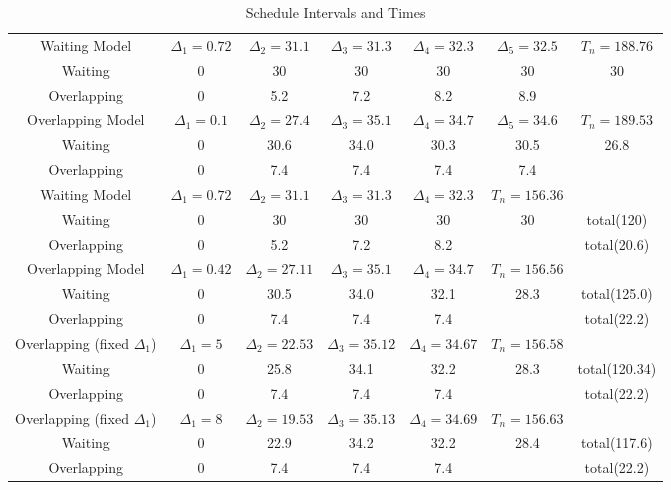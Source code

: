 \documentclass{article}
\begin{document}
\begin{table}[ht]
    \centering
    \caption{Schedule Intervals and Times}
    \begin{tabular}{ccccccc}
    \hline
    \hline
    Waiting Model  & $\Delta_1= 0.72$ & $\Delta_2= 31.1$ & $\Delta_3=31.3$ & $\Delta_4 = 32.3$ & $\Delta_5=32.5$ & $T_{n} = 188.76$ \\
    Waiting  &  0 & 30  & 30  & 30 & 30 & 30 \\
    Overlapping & 0 &  5.2 & 7.2 & 8.2 &  8.9 & \\ 
    \hline
    Overlapping Model  & $\Delta_1= 0.1$ & $\Delta_2= 27.4$ & $\Delta_3 = 35.1$ & $\Delta_4= 34.7$ & $\Delta_5 = 34.6$ & $T_{n} = 189.53$ \\
    Waiting   & 0  & 30.6 & 34.0 & 30.3 & 30.5 & 26.8 \\
    Overlapping & 0 & 7.4 & 7.4 & 7.4 & 7.4 & \\
    \hline
    Waiting Model  & $\Delta_1= 0.72$ & $\Delta_2= 31.1$ & $\Delta_3=31.3$ & $\Delta_4 = 32.3$ & $T_{n} = 156.36$ \\
    Waiting  & 0 & 30  & 30  & 30 & 30  & total(120)\\
    Overlapping & 0 &  5.2 & 7.2 & 8.2  &  & total(20.6)\\ 
    \hline
    Overlapping Model  & $\Delta_1= 0.42$ & $\Delta_2= 27.11$ & $\Delta_3 = 35.1$ & $\Delta_4= 34.7$ & $T_{n} = 156.56$ \\
    Waiting  &  0  & 30.5 & 34.0  & 32.1 & 28.3 & total(125.0)\\
    Overlapping & 0 & 7.4 & 7.4 & 7.4  &  & total(22.2)\\
    \hline
    Overlapping (fixed $\Delta_1$)  & $\Delta_1= 5$ & $\Delta_2= 22.53$ & $\Delta_3 = 35.12$ & $\Delta_4= 34.67$ & $T_{n} = 156.58$ \\
    Waiting  &  0  & 25.8 & 34.1  & 32.2 & 28.3 & total(120.34)\\
    Overlapping & 0 & 7.4 & 7.4 & 7.4  &  & total(22.2)\\
    \hline
    Overlapping (fixed $\Delta_1$)  & $\Delta_1= 8$ & $\Delta_2= 19.53$ & $\Delta_3 = 35.13$ & $\Delta_4= 34.69$ & $T_{n} = 156.63$ \\
    Waiting  &  0  & 22.9 & 34.2  & 32.2 & 28.4 & total(117.6) \\
    Overlapping & 0 & 7.4 & 7.4 & 7.4  &  & total(22.2) \\
    \hline
    \end{tabular}
  \end{table}
\end{document}
